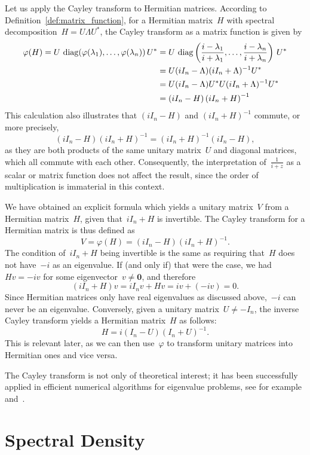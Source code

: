 Let us apply the Cayley transform to Hermitian matrices. According to Definition~\ref{def:matrix_function}, for a Hermitian matrix~$H$ with spectral decomposition~$H = U \Lambda U^*$, the Cayley transform as a matrix function is given by
\begin{align*}
    \varphi(H) = U \, \operatorname{diag}(\varphi(\lambda_1), \ldots, \varphi(\lambda_n)) \, U^* & = U \, \operatorname{diag}\left(\frac{i - \lambda_1}{i + \lambda_1}, \ldots, \frac{i - \lambda_n}{i + \lambda_n}\right) \, U^*\\
    & = U (i I_n - \Lambda) (i I_n + \Lambda)^{-1} U^*\\
    & = U (i I_n - \Lambda) U^* U (i I_n + \Lambda)^{-1} U^*\\
    & = (i I_n - H) \left( i I_n + H \right)^{-1}
\end{align*}
This calculation also illustrates that $(i I_n - H)$ and $(i I_n + H)^{-1}$ commute, or more precisely, 
\[
(i I_n - H)(i I_n + H)^{-1} = (i I_n + H)^{-1}(i I_n - H),
\]
as they are both products of the same unitary matrix~$U$ and diagonal matrices, which all commute with each other. Consequently, the interpretation of~$\frac{1}{i + z}$ as a scalar or matrix function does not affect the result, since the order of multiplication is immaterial in this context.

We have obtained an explicit formula which yields a unitary matrix~$V$ from a Hermitian matrix~$H$, given that~$i I_n + H$ is invertible. The Cayley transform for a Hermitian matrix is thus defined as
\[
V = \varphi(H) = (i I_n - H)(i I_n + H)^{-1}.
\]
The condition of~$i I_n + H$ being invertible is the same as requiring that~$H$ does not have~$-i$ as an eigenvalue. If (and only if) that were the case, we had~$Hv=-iv$ for some eigenvector~$v \neq \mathbf{0}$, and therefore
\[
(i I_n + H) v = i I_n v + H v = i v + (-i v) = 0.
\]
Since Hermitian matrices only have real eigenvalues as discussed above,~$-i$ can never be an eigenvalue. Conversely, given a unitary matrix~$U \neq -I_n$, the inverse Cayley transform yields a Hermitian matrix~$H$ as follows:
\[
H = i (I_n - U)(I_n + U)^{-1}.
\]
This is relevant later, as we can then use~$\varphi$ to transform unitary matrices into Hermitian ones and vice versa.

The Cayley transform is not only of theoretical interest; it has been successfully applied in efficient numerical algorithms for eigenvalue problems, see for example~\cite{aurentzmachvandebrilwatkins} and~\cite{meerbergenspenceroose}.

\section{Spectral Density}

